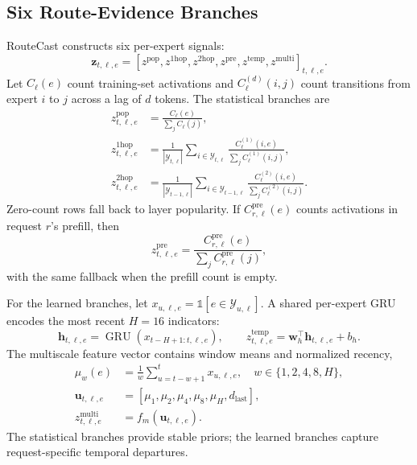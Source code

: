 \documentclass[conference]{IEEEtran}
\begin{document}
\subsection{Six Route-Evidence Branches}
RouteCast constructs six per-expert signals:
\begin{equation}
\mathbf{z}_{t,\ell,e}=
[z^{\mathrm{pop}},z^{1\mathrm{hop}},z^{2\mathrm{hop}},
z^{\mathrm{pre}},z^{\mathrm{temp}},z^{\mathrm{multi}}]_{t,\ell,e}.
\end{equation}
Let $C_\ell(e)$ count training-set activations and $C_\ell^{(d)}(i,j)$ count transitions from expert $i$ to $j$ across a lag of $d$ tokens. The statistical branches are
\begin{align}
z^{\mathrm{pop}}_{t,\ell,e}
&=\frac{C_\ell(e)}{\sum_j C_\ell(j)},\\
z^{1\mathrm{hop}}_{t,\ell,e}
&=\frac{1}{|\mathcal{Y}_{t,\ell}|}
\sum_{i\in\mathcal{Y}_{t,\ell}}
\frac{C_\ell^{(1)}(i,e)}{\sum_jC_\ell^{(1)}(i,j)},\\
z^{2\mathrm{hop}}_{t,\ell,e}
&=\frac{1}{|\mathcal{Y}_{t-1,\ell}|}
\sum_{i\in\mathcal{Y}_{t-1,\ell}}
\frac{C_\ell^{(2)}(i,e)}{\sum_jC_\ell^{(2)}(i,j)}.
\label{eq:statistical-branches}
\end{align}
Zero-count rows fall back to layer popularity. If $C^{\mathrm{pre}}_{r,\ell}(e)$ counts activations in request $r$'s prefill, then
\begin{equation}
z^{\mathrm{pre}}_{t,\ell,e}=
\frac{C^{\mathrm{pre}}_{r,\ell}(e)}
{\sum_jC^{\mathrm{pre}}_{r,\ell}(j)},
\label{eq:prefill-branch}
\end{equation}
with the same fallback when the prefill count is empty.

For the learned branches, let $x_{u,\ell,e}=\mathbb{1}[e\in\mathcal{Y}_{u,\ell}]$. A shared per-expert GRU encodes the most recent $H=16$ indicators:
\begin{equation}
\mathbf{h}_{t,\ell,e}=\operatorname{GRU}
(x_{t-H+1:t,\ell,e}),\qquad
z^{\mathrm{temp}}_{t,\ell,e}=\mathbf{w}_h^\top\mathbf{h}_{t,\ell,e}+b_h.
\label{eq:temporal-branch}
\end{equation}
The multiscale feature vector contains window means and normalized recency,
\begin{align}
\mu_w(e)&=\frac{1}{w}\sum_{u=t-w+1}^{t}x_{u,\ell,e},
\quad w\in\{1,2,4,8,H\},\\
\mathbf{u}_{t,\ell,e}&=[\mu_1,\mu_2,\mu_4,\mu_8,\mu_H,d_{\mathrm{last}}],\\
z^{\mathrm{multi}}_{t,\ell,e}&=f_m(\mathbf{u}_{t,\ell,e}).
\label{eq:multiscale-branch}
\end{align}
The statistical branches provide stable priors; the learned branches capture request-specific temporal departures.
\end{document}
